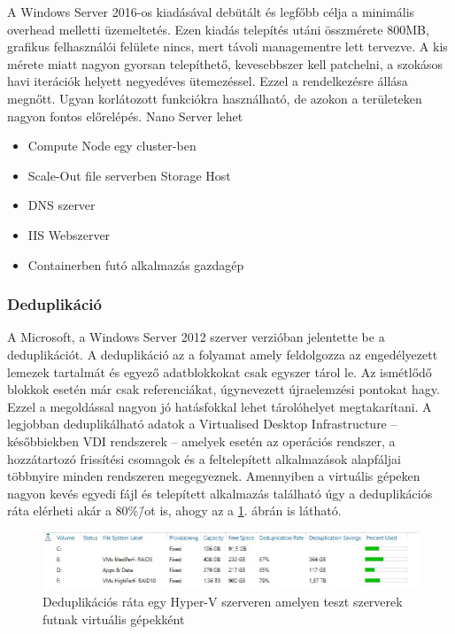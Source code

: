 \documentclass[12pt,oneside,justify,table]{book}
\begin{document}
A Windows Server 2016-os kiadásával debütált és legfőbb célja a minimális overhead melletti üzemeltetés. 
Ezen kiadás telepítés utáni összmérete 800MB, grafikus felhasználói felülete nincs, mert távoli managementre lett tervezve.
A kis mérete miatt nagyon gyorsan telepíthető, kevesebbszer kell patchelni, a szokásos havi iterációk helyett negyedéves ütemezéssel. 
Ezzel a rendelkezésre állása megnőtt. 
Ugyan korlátozott funkciókra használható, de azokon a területeken nagyon fontos előrelépés. 
Nano Server lehet 
\begin{itemize}
	\item Compute Node egy cluster-ben
	\item Scale-Out file serverben Storage Host
	\item DNS szerver
	\item IIS Webszerver
	\item Containerben futó alkalmazás gazdagép
\end{itemize}

\subsubsection{Deduplikáció}

A Microsoft, a Windows Server 2012 szerver verzióban jelentette be a deduplikációt. 
A deduplikáció az a folyamat amely feldolgozza az engedélyezett lemezek tartalmát és egyező adatblokkokat csak egyszer tárol le. Az ismétlődő blokkok esetén már csak referenciákat, úgynevezett újraelemzési pontokat hagy. 
Ezzel a megoldással nagyon jó hatásfokkal lehet tárolóhelyet megtakarítani. 
A legjobban deduplikálható adatok a Virtualised Desktop Infrastructure -- későbbiekben VDI rendszerek -- amelyek esetén az operációs rendszer, a hozzátartozó frissítési csomagok és a feltelepített alkalmazások alapfáljai többnyire minden rendszeren megegyeznek. 
Amennyiben a virtuális gépeken nagyon kevés egyedi fájl és telepített alkalmazás található úgy a deduplikációs ráta elérheti akár a 80\%\=/ot is, ahogy az a \ref{fig:deduplication_ratio}. ábrán is látható.

\begin{figure}[H]
\centering
\includegraphics[width=1\textwidth]{deduplication-ratio-sample}
\caption{Deduplikációs ráta egy Hyper-V szerveren amelyen teszt szerverek futnak virtuális gépekként}
\label{fig:deduplication_ratio}
\end{figure}
\end{document}
